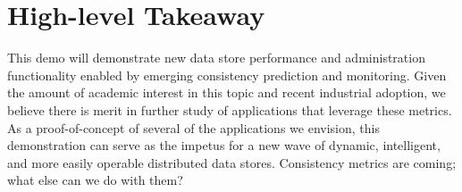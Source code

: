 \section{High-level Takeaway}

This demo will demonstrate new data store performance and
administration functionality enabled by emerging consistency
prediction and monitoring. Given the amount of academic interest in
this topic and recent industrial adoption, we believe there is merit
in further study of applications that leverage these metrics. As a
proof-of-concept of several of the applications we envision, this
demonstration can serve as the impetus for a new wave of dynamic,
intelligent, and more easily operable distributed data
stores. Consistency metrics are coming; what else can we do with them?
